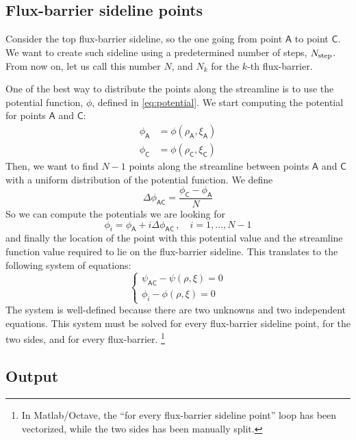 \documentclass[b5paper,11pt,oneside,fleqn]{article}
\newcommand{\pt}[1]{\mathsf{#1}}
\newcommand{\Nstep}{N_{\textup{step}}}
\begin{document}
\subsection{Flux-barrier sideline points}

Consider the top flux-barrier sideline, so the one going from point $ \pt{A} $ 
to point $ \pt{C} $.
We want to create such sideline using a predetermined number of steps,
$ \Nstep $. From now on, let us call this number $ N $, 
and $ N_k $ for the $ k $-th flux-barrier.

One of the best way to distribute the points along the streamline is to use the 
potential function, $ \phi $, defined in \autoref{eq:potential}.
We start computing the potential for points $ \pt{A} $ and $ \pt{C} $:
\begin{equation*}
\begin{aligned}
\phi_\pt{A} &= \phi(\rho_\pt{A}, \xi_\pt{A}) \\
\phi_\pt{C} &= \phi(\rho_\pt{C}, \xi_\pt{C}) 
\end{aligned}
\end{equation*}
Then, we want to find $ N-1 $ points along the streamline
between points $ \pt{A} $ and $ \pt{C} $
with a uniform distribution of the potential function.
We define
\begin{equation*}
\Delta\phi_{\pt{AC}} = \frac{\phi_\pt{C} - \phi_\pt{A}}{N}
\end{equation*}
So we can compute the potentials we are looking for
\[
\phi_i = \phi_\pt{A} + i \Delta\phi_{\pt{AC}} \,,\quad i=1,\ldots,N-1
\]
and finally the location of the point with this potential value and the 
streamline function value required to lie on the flux-barrier sideline.
This translates to the following system of equations:
\begin{equation}
\begin{cases}
\psi_{\pt{AC}} - \psi(\rho,\xi) = 0 \\
\phi_i - \phi(\rho,\xi) = 0
\end{cases}
\end{equation}
The system is well-defined because there are two unknowns and two independent 
equations. This system must be solved for every flux-barrier sideline point, 
for the two sides, and for every flux-barrier.%
\footnote{In Matlab/Octave, the ``for every flux-barrier sideline point'' loop 
has been vectorized, while the two sides has been manually split.}


\subsection{Output}
\end{document}
